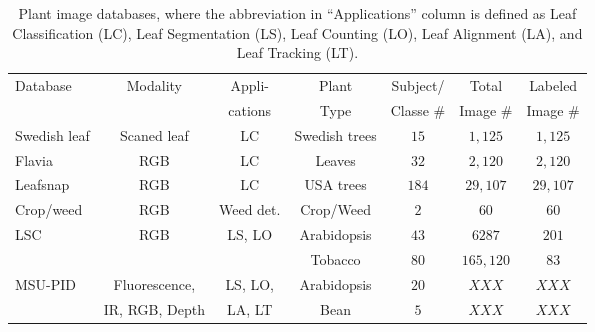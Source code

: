 \begin{table*}[t!]
	\centering
	\caption{Plant image databases, where the abbreviation in ``Applications'' column is defined as Leaf Classification (LC), Leaf Segmentation (LS), Leaf Counting (LO), Leaf Alignment (LA), and Leaf Tracking (LT).}
	\resizebox{12cm}{!} {
	\begin{tabular}{l|c|c|c|c|c|c}
		\hline
		\multirow{2}{*}{Database}&  \multirow{2}{*}{Modality}  & Appli-& Plant & Subject/ &Total  &  Labeled   \\ 						
			&         & cations &            Type         &       Classe \#         &  Image \#    & Image \# \\ \hline
		
Swedish leaf &  Scaned leaf & LC& Swedish trees & $15$ & $1,125$ & $1,125$ \\ \hline
Flavia& RGB  & LC& Leaves & $32$  & $2,120$ & $2,120$ \\ \hline
Leafsnap  & RGB & LC& USA trees & $184$ & $29,107$  &  $29,107$ \\ \hline
Crop/weed &  RGB &Weed det. & Crop/Weed & $2$  & $60$ & $60$ \\ \hline
\multirow{2}{*}{LSC} & \multirow{2}{*}{RGB}  & \multirow{2}{*}{LS, LO} & Arabidopsis &  $43$ & $6287$ & $201$ \\ \cline{4-7}
							    &  & & Tobacco & $80$ & $165,120$ & $83$ \\ \hline
\multirow{2}{*}{MSU-PID}  & Fluorescence,  & LS, LO, & Arabidopsis &  $20$ & $XXX$ & $XXX$ \\ \cline{4-7}
							    & IR, RGB, Depth & LA, LT & Bean & $5$ & $XXX$ & $XXX$ \\ \hline
	       \hline
	\end{tabular}
	}
	\label{tab:database}
\end{table*}
